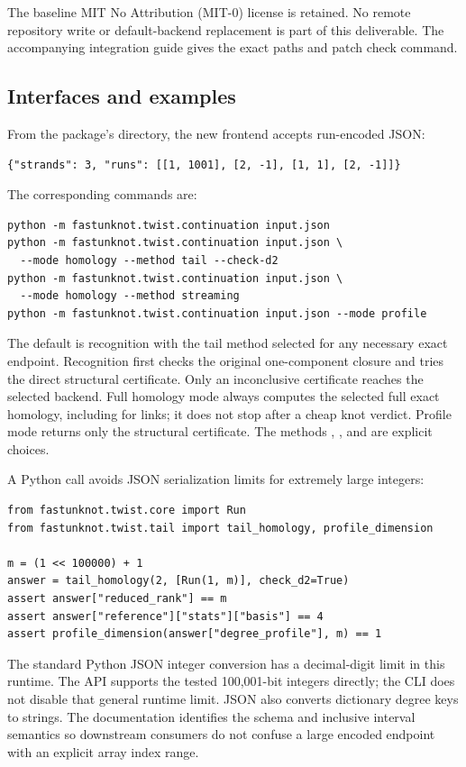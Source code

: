 The baseline MIT No Attribution (MIT-0) license is retained.
No remote repository write or
default-backend replacement is part of this deliverable.
The accompanying integration guide gives the exact paths and patch
check command.

\subsection{Interfaces and examples}

From the package's  directory, the new frontend accepts
run-encoded JSON:
\begin{lstlisting}
{"strands": 3, "runs": [[1, 1001], [2, -1], [1, 1], [2, -1]]}
\end{lstlisting}
The corresponding commands are:
\begin{lstlisting}
python -m fastunknot.twist.continuation input.json
python -m fastunknot.twist.continuation input.json \
  --mode homology --method tail --check-d2
python -m fastunknot.twist.continuation input.json \
  --mode homology --method streaming
python -m fastunknot.twist.continuation input.json --mode profile
\end{lstlisting}

The default is recognition with the tail method selected for any
necessary exact endpoint. Recognition first checks the original
one-component closure and tries the direct structural certificate.
Only an inconclusive certificate reaches the selected backend.
Full homology mode always computes the selected full exact homology,
including for links; it does not stop after a cheap knot verdict.
Profile mode returns only the structural certificate.
The methods \code{tail}, \code{streaming}, and \code{macro} are explicit
choices.

A Python call avoids JSON serialization limits for extremely large
integers:
\begin{lstlisting}
from fastunknot.twist.core import Run
from fastunknot.twist.tail import tail_homology, profile_dimension

m = (1 << 100000) + 1
answer = tail_homology(2, [Run(1, m)], check_d2=True)
assert answer["reduced_rank"] == m
assert answer["reference"]["stats"]["basis"] == 4
assert profile_dimension(answer["degree_profile"], m) == 1
\end{lstlisting}

The standard Python JSON integer conversion has a decimal-digit
limit in this runtime. The API supports the tested 100,001-bit
integers directly; the CLI does not disable that general runtime
limit. JSON also converts dictionary degree keys to strings.
The documentation identifies the schema and inclusive interval
semantics so downstream consumers do not confuse a large encoded
endpoint with an explicit array index range.


